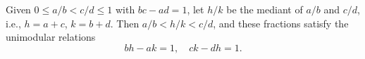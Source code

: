 Given $0 \leq a/b < c/d \leq 1$ with $bc - ad = 1$, let $h/k$ be the mediant of $a/b$ and $c/d$, i.e., $h = a + c$, $k = b + d$. Then $a/b < h/k < c/d$, and these fractions satisfy the unimodular relations
$$bh - ak = 1, \quad ck - dh = 1.$$
